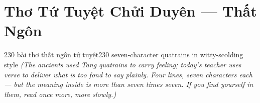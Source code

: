 \chapter{Thơ Tứ Tuyệt Chửi Duyên — Thất Ngôn}

\begin{truyen}{230 bài thơ thất ngôn tứ tuyệt}{230 seven-character quatrains in witty-scolding style}
\textit{(The ancients used Tang quatrains to carry feeling; today's teacher uses verse to deliver what is too fond to say plainly. Four lines, seven characters each --- but the meaning inside is more than seven times seven. If you find yourself in them, read once more, more slowly.)}
\end{truyen}


\newcommand{\poemtitle}[1]{%
	\IfSubStr{#1}{ — }{%
		\StrBehind{#1}{ — }[\poemtitlestripped]%
		\poemtitlestripped
	}{#1}%
}

\newcommand{\baitho}[3]{%
	\refstepcounter{baitho}%
  \begin{tcolorbox}[
    enhanced,
		breakable,
    colback=v3bg,
		colframe=v3primary!70!black,
		arc=4pt,
		boxrule=0.5pt,
		left=8pt,
		right=8pt,
		top=10pt,
		bottom=8pt,
		borderline west={2.5pt}{0pt}{v3secondary},
		attach boxed title to top left={xshift=8pt,yshift=-2.5mm},
		boxed title style={
			colback=v3secondary,
			colframe=v3secondary,
			arc=2pt,
			boxrule=0pt,
			left=6pt,
			right=6pt,
			top=4pt,
			bottom=4pt,
		},
		title={\strut\small\bfseries\color{white} Bài \thebaitho},
  ]
		{\raggedright\Large\bfseries\color{v3text}\poemtitle{#1}\par}
	\vspace{3pt}
	{\color{v3secondary!55!black}\rule{\linewidth}{0.45pt}\par}
	\vspace{6pt}
	\begin{center}
	\setlength{\parskip}{2pt}
	{\large\bfseries\color{v3text} #2}\\[7pt]
	{\small\itshape\color{v3primary!85!black} #3}
	\end{center}
  \end{tcolorbox}
  \vspace{4pt}
}

